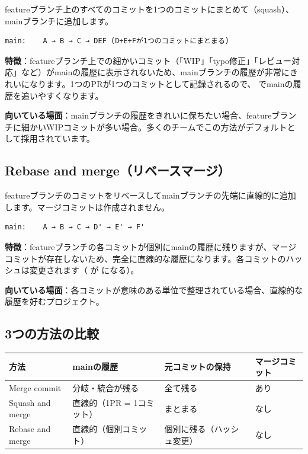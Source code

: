 featureブランチ上のすべてのコミットを1つのコミットにまとめて（squash）、mainブランチに追加します。

\begin{lstlisting}[language={}]
main:    A → B → C → DEF (D+E+Fが1つのコミットにまとまる)
\end{lstlisting}

\textbf{特徴}：featureブランチ上での細かいコミット（「WIP」「typo修正」「レビュー対応」など）がmainの履歴に表示されないため、mainブランチの履歴が非常にきれいになります。1つのPRが1つのコミットとして記録されるので、 でmainの履歴を追いやすくなります。

\textbf{向いている場面}：mainブランチの履歴をきれいに保ちたい場合、featureブランチに細かいWIPコミットが多い場合。多くのチームでこの方法がデフォルトとして採用されています。

\subsection{Rebase and merge（リベースマージ）}

featureブランチのコミットをリベースしてmainブランチの先端に直線的に追加します。マージコミットは作成されません。

\begin{lstlisting}[language={}]
main:    A → B → C → D' → E' → F'
\end{lstlisting}

\textbf{特徴}：featureブランチの各コミットが個別にmainの履歴に残りますが、マージコミットが存在しないため、完全に直線的な履歴になります。各コミットのハッシュは変更されます（ が  になる）。

\textbf{向いている場面}：各コミットが意味のある単位で整理されている場合、直線的な履歴を好むプロジェクト。

\subsection{3つの方法の比較}

\begin{tabular}{|l|l|l|l|}
\hline
\textbf{方法} & \textbf{mainの履歴} & \textbf{元コミットの保持} & \textbf{マージコミット} \\
\hline
Merge commit & 分岐・統合が残る & 全て残る & あり \\
\hline
Squash and merge & 直線的（1PR = 1コミット） & まとまる & なし \\
\hline
Rebase and merge & 直線的（個別コミット） & 個別に残る（ハッシュ変更） & なし \\
\hline
\end{tabular}

